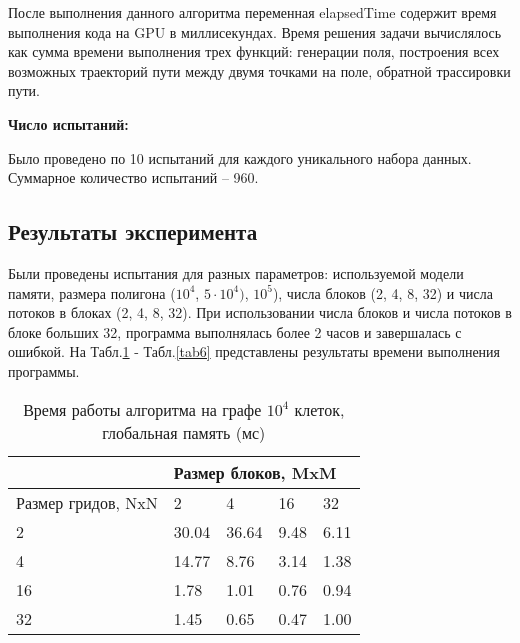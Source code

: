 \documentclass[a4paper, 12pt]{article}
\begin{document}
    После выполнения данного алгоритма переменная elapsedTime содержит время выполнения кода на GPU в миллисекундах. Время решения задачи вычислялось как сумма времени выполнения трех функций: генерации поля, построения всех возможных траекторий пути между двумя точками на поле, обратной трассировки пути.
    \medskip \par
    \textbf{Число испытаний:}
    
    Было проведено по 10 испытаний для каждого уникального набора данных. Суммарное количество испытаний -- 960.
    
    \subsection{Результаты эксперимента}
    Были проведены испытания для разных параметров: используемой модели памяти, размера полигона ($10^4$, $5\cdot10^4)$, $10^5$), числа блоков (2, 4, 8, 32) и числа потоков в блоках (2, 4, 8, 32). При использовании числа блоков и числа потоков в блоке больших 32, программа выполнялась более 2 часов и завершалась с ошибкой.
    На Табл.\ref{tab1} - Табл.\ref{tab6} представлены результаты времени выполнения программы.
    \clearpage
    \begin{table}[h!]
    \centering
\begin{tabular}{|l|llll|}
\hline
 & \multicolumn{4}{l|}{Размер блоков, MxM} \\ \hline
Размер гридов, NxN & \multicolumn{1}{l|}{2} & \multicolumn{1}{l|}{4} & \multicolumn{1}{l|}{16} & 32 \\ \hline
2 & \multicolumn{1}{l|}{30.04} & \multicolumn{1}{l|}{36.64} & \multicolumn{1}{l|}{9.48} & 6.11 \\ \hline
4 & \multicolumn{1}{l|}{14.77} & \multicolumn{1}{l|}{8.76} & \multicolumn{1}{l|}{3.14} & 1.38 \\ \hline
16 & \multicolumn{1}{l|}{1.78} & \multicolumn{1}{l|}{1.01} & \multicolumn{1}{l|}{0.76} & 0.94 \\ \hline
32 & \multicolumn{1}{l|}{1.45} & \multicolumn{1}{l|}{0.65} & \multicolumn{1}{l|}{0.47} & 1.00 \\ \hline
\end{tabular}
\caption{Время работы алгоритма на графе $10^4$ клеток, глобальная память (мс)}
\label{tab1}
\end{table}
\end{document}
